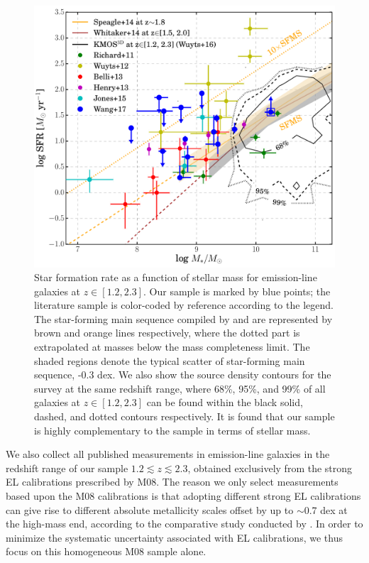 \begin{figure}
    \centering
    \includegraphics[width=\textwidth]{fig/SFMS.pdf}
    \caption[Star formation rate as a function of stellar mass for emission-line galaxies.]
    {Star formation rate as a function of stellar mass for emission-line galaxies at
    $z\in[1.2,2.3]$. Our \mg sample is marked by blue points; the
    literature sample is color-coded by reference according to the legend. The star-forming
    main sequence compiled by
    \citet{Speagle:2014dd} and \citet{Whitaker:2014ko} are represented by brown and orange
    lines respectively, where the dotted part is extrapolated at masses below the mass
    completeness limit.  The shaded regions denote the typical scatter of star-forming main
    sequence, -0.3
    dex. We also show the source density contours for the \kd survey at the same redshift
    range, where 68\%, 95\%, and 99\% of all \kd galaxies at $z\in[1.2,2.3]$ can be found
    within the black solid, dashed, and dotted contours respectively.
    It is found that our sample is highly complementary to the \kd sample in terms of stellar
    mass.}
    \label{fig:SFMS}
\end{figure}


We also collect all published \gpm measurements in emission-line galaxies in the redshift range of our sample
$1.2\lesssim z\lesssim2.3$, obtained exclusively from the strong EL calibrations
prescribed by M08. The reason we only select measurements based upon
the M08 calibrations is that adopting different strong EL calibrations
can give rise to different absolute metallicity scales offset by up to
$\sim$0.7 dex at the high-mass end, according to the comparative study conducted by
\citet{Kewley:2008be}.  In order to minimize the systematic uncertainty associated with EL
calibrations, we thus focus on this homogeneous M08 sample alone.

